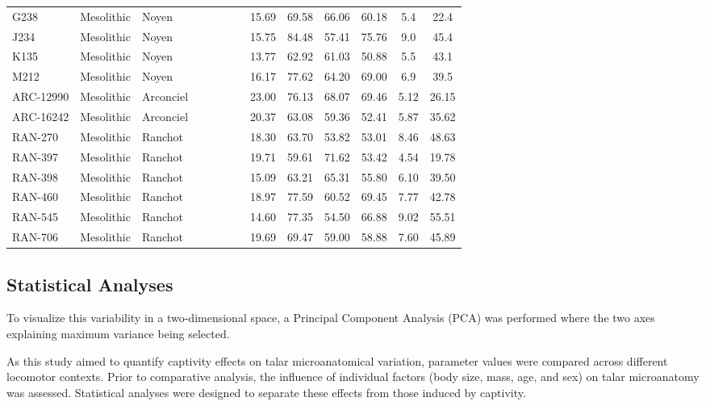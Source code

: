 \documentclass[12pt,a4paper]{article}
\begin{document}
\begin{landscape}
\begin{table}[!htbp]
\begin{tabular}{@{}lllccccccccc@{}}
    G238 & Mesolithic & Noyen & ~ & ~ & ~ & 15.69 & 69.58 & 66.06 & 60.18 & 5.4 & 22.4 \\
    J234 & Mesolithic & Noyen & ~ & ~ & ~ & 15.75 & 84.48 & 57.41 & 75.76 & 9.0 & 45.4 \\
    K135 & Mesolithic & Noyen & ~ & ~ & ~ & 13.77 & 62.92 & 61.03 & 50.88 & 5.5 & 43.1 \\
    M212 & Mesolithic & Noyen & ~ & ~ & ~ & 16.17 & 77.62 & 64.20 & 69.00 & 6.9 & 39.5 \\
    ARC-12990 & Mesolithic & Arconciel & ~ & ~ & ~ & 23.00 & 76.13 & 68.07 & 69.46 & 5.12 & 26.15 \\
    ARC-16242 & Mesolithic & Arconciel & ~ & ~ & ~ & 20.37 & 63.08 & 59.36 & 52.41 & 5.87 & 35.62 \\
    RAN-270 & Mesolithic & Ranchot & ~ & ~ & ~ & 18.30 & 63.70 & 53.82 & 53.01 & 8.46 & 48.63 \\
    RAN-397 & Mesolithic & Ranchot & ~ & ~ & ~ & 19.71 & 59.61 & 71.62 & 53.42 & 4.54 & 19.78 \\
    RAN-398 & Mesolithic & Ranchot & ~ & ~ & ~ & 15.09 & 63.21 & 65.31 & 55.80 & 6.10 & 39.50 \\
    RAN-460 & Mesolithic & Ranchot & ~ & ~ & ~ & 18.97 & 77.59 & 60.52 & 69.45 & 7.77 & 42.78 \\
    RAN-545 & Mesolithic & Ranchot & ~ & ~ & ~ & 14.60 & 77.35 & 54.50 & 66.88 & 9.02 & 55.51 \\
    RAN-706 & Mesolithic & Ranchot & ~ & ~ & ~ & 19.69 & 69.47 & 59.00 & 58.88 & 7.60 & 45.89 \\
    \bottomrule
    \end{tabular}
    \end{table}
\end{landscape}

\subsection{Statistical Analyses}

To visualize this variability in a two-dimensional space, a Principal Component Analysis (PCA) was performed where the two axes explaining maximum variance being selected.

As this study aimed to quantify captivity effects on talar microanatomical variation, parameter values were compared across different locomotor contexts. Prior to comparative analysis, the influence of individual factors (body size, mass, age, and sex) on talar microanatomy was assessed. Statistical analyses were designed to separate these effects from those induced by captivity.
\end{document}
